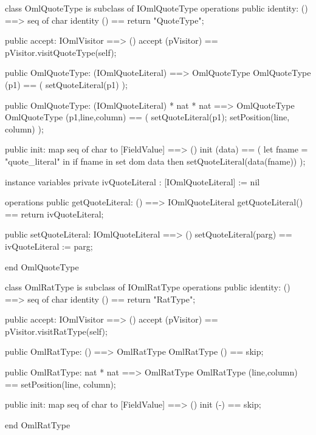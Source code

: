 \begin{vdm_al}
class OmlQuoteType is subclass of IOmlQuoteType
operations
  public identity: () ==> seq of char
  identity () == return "QuoteType";

  public accept: IOmlVisitor ==> ()
  accept (pVisitor) == pVisitor.visitQuoteType(self);

  public OmlQuoteType:
    (IOmlQuoteLiteral) ==> OmlQuoteType
  OmlQuoteType (p1) == 
    ( setQuoteLiteral(p1) );

  public OmlQuoteType:
    (IOmlQuoteLiteral) *
    nat *
    nat ==> OmlQuoteType
  OmlQuoteType (p1,line,column) == 
    ( setQuoteLiteral(p1);
      setPosition(line, column) );

  public init: map seq of char to [FieldValue] ==> ()
  init (data) ==
    ( let fname = "quote_literal" in
        if fname in set dom data
        then setQuoteLiteral(data(fname)) );

instance variables
  private ivQuoteLiteral : [IOmlQuoteLiteral] := nil

operations
  public getQuoteLiteral: () ==> IOmlQuoteLiteral
  getQuoteLiteral() == return ivQuoteLiteral;

  public setQuoteLiteral: IOmlQuoteLiteral ==> ()
  setQuoteLiteral(parg) == ivQuoteLiteral := parg;

end OmlQuoteType
\end{vdm_al}

\begin{vdm_al}
class OmlRatType is subclass of IOmlRatType
operations
  public identity: () ==> seq of char
  identity () == return "RatType";

  public accept: IOmlVisitor ==> ()
  accept (pVisitor) == pVisitor.visitRatType(self);

  public OmlRatType:
    () ==> OmlRatType
  OmlRatType () == 
    skip;

  public OmlRatType:
    nat *
    nat ==> OmlRatType
  OmlRatType (line,column) == 
    setPosition(line, column);

  public init: map seq of char to [FieldValue] ==> ()
  init (-) == skip;

end OmlRatType
\end{vdm_al}

